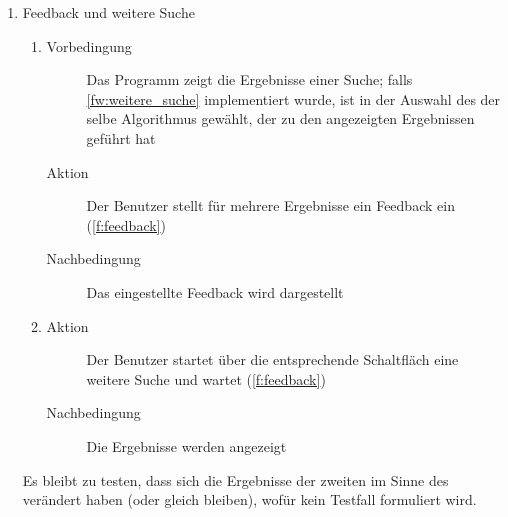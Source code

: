 \begin{enumerate} [label=\bfseries /TS \arabic*0/, leftmargin=*]
\begin{enumerate}[leftmargin=0pt]
\begin{description}
			\item[Nachbedingung] Das eben gewählte Bild wird in der vergrößerten Ansicht dargestellt; der gewählte Bildbereich wird angezeigt
		\end{description}
		\item
		\begin{description}
			\item[Aktion] Der Benutzer verwendet die Schaltflächen, um zum nächsten und vorherigen Bild zu wechseln (\ref{f:vorheriges_naechstes})
			\item[Nachbedingung] Das Bild in der größeren Ansicht wechselt vor bzw. zurück entsprechend der durch die Übersicht gegebenen Reihenfolge
		\end{description}
		\item
		\begin{description}
			\item[Aktion] Der Benutzer linksklickt die Schaltfläche zur Rückkehr zur Bibliothek \ref{f:rückkehr_zu_bibliothek}
			\item[Nachbedingung] Die Bibliothek wird angezeigt
		\end{description}
	\end{enumerate}

	\item \gls{Feedback} und weitere Suche \label{ts:feedback}
	\begin{enumerate}[leftmargin=0pt]
		\item
		\begin{description}
			\item[Vorbedingung] Das Programm zeigt die Ergebnisse einer Suche; falls \ref{fw:weitere_suche} implementiert wurde, ist in der Auswahl des  der selbe Algorithmus gewählt, der zu den angezeigten Ergebnissen geführt hat
			\item[Aktion] Der Benutzer stellt für mehrere Ergebnisse ein \gls{Feedback} ein (\ref{f:feedback})
			\item[Nachbedingung] Das eingestellte \gls{Feedback} wird dargestellt
		\end{description}
		\item
		\begin{description}
			\item[Aktion] Der Benutzer startet über die entsprechende Schaltfläch eine weitere Suche und wartet (\ref{f:feedback})
			\item[Nachbedingung] Die Ergebnisse werden angezeigt
		\end{description}
	\end{enumerate}
	Es bleibt zu testen, dass sich die Ergebnisse der zweiten im Sinne des  verändert haben (oder gleich bleiben), wofür kein Testfall formuliert wird.


\end{enumerate}
